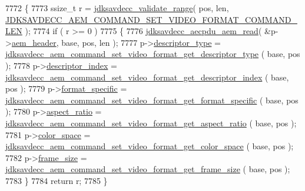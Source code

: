 \begin{DoxyCode}
7772 \{
7773     ssize\_t r = \hyperlink{group__util_ga9c02bdfe76c69163647c3196db7a73a1}{jdksavdecc\_validate\_range}( pos, len, 
      \hyperlink{group__command__set__video__format_ga749abf27446db425e799ee63bab7b4ef}{JDKSAVDECC\_AEM\_COMMAND\_SET\_VIDEO\_FORMAT\_COMMAND\_LEN} );
7774     \textcolor{keywordflow}{if} ( r >= 0 )
7775     \{
7776         \hyperlink{group__aecpdu__aem_gae2421015dcdce745b4f03832e12b4fb6}{jdksavdecc\_aecpdu\_aem\_read}( &p->\hyperlink{structjdksavdecc__aem__command__set__video__format_ae1e77ccb75ff5021ad923221eab38294}{aem\_header}, base, pos, len );
7777         p->\hyperlink{structjdksavdecc__aem__command__set__video__format_ab7c32b6c7131c13d4ea3b7ee2f09b78d}{descriptor\_type} = 
      \hyperlink{group__command__set__video__format_ga983440a8fd05f5e141c68beb1c5269d7}{jdksavdecc\_aem\_command\_set\_video\_format\_get\_descriptor\_type}
      ( base, pos );
7778         p->\hyperlink{structjdksavdecc__aem__command__set__video__format_a042bbc76d835b82d27c1932431ee38d4}{descriptor\_index} = 
      \hyperlink{group__command__set__video__format_ga45e769607c8f42b7f0755c8e73255b5b}{jdksavdecc\_aem\_command\_set\_video\_format\_get\_descriptor\_index}
      ( base, pos );
7779         p->\hyperlink{structjdksavdecc__aem__command__set__video__format_acbfc36b550978f88cf0a3d9d2b2ce0dd}{format\_specific} = 
      \hyperlink{group__command__set__video__format_ga59898adde209c53001ee2bb4b00a7907}{jdksavdecc\_aem\_command\_set\_video\_format\_get\_format\_specific}
      ( base, pos );
7780         p->\hyperlink{structjdksavdecc__aem__command__set__video__format_aa2976b5991e88ce43c451d2683d5f329}{aspect\_ratio} = 
      \hyperlink{group__command__set__video__format_ga747c3dc808e77c1c21b3242387569d2b}{jdksavdecc\_aem\_command\_set\_video\_format\_get\_aspect\_ratio}
      ( base, pos );
7781         p->\hyperlink{structjdksavdecc__aem__command__set__video__format_a5f1234a863bb834ff7c110509884d228}{color\_space} = 
      \hyperlink{group__command__set__video__format_ga138c281f1cf75b478af2d0b29c3b6713}{jdksavdecc\_aem\_command\_set\_video\_format\_get\_color\_space}
      ( base, pos );
7782         p->\hyperlink{structjdksavdecc__aem__command__set__video__format_a0229abcfe4414f86dcf52c5ebf84311c}{frame\_size} = 
      \hyperlink{group__command__set__video__format_gad626b7523c443035f32956aebf8f38bd}{jdksavdecc\_aem\_command\_set\_video\_format\_get\_frame\_size}
      ( base, pos );
7783     \}
7784     \textcolor{keywordflow}{return} r;
7785 \}
\end{DoxyCode}


